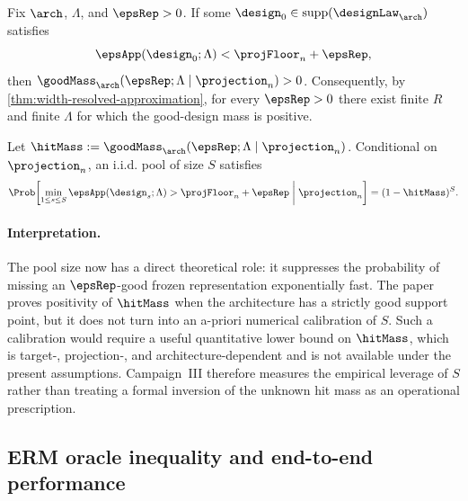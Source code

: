 \begin{proposition}
\label{prop:positive-good-mass}
Fix $\arch$, $\Lambda$, and $\epsRep>0$.  If some
$\design_0\in\operatorname{supp}(\designLaw_{\arch})$ satisfies
\begin{equation}
    \epsApp(\design_0;\Lambda)<\projFloor_n+\epsRep,
    \label{eq:strict-good-support-design}
\end{equation}
then
$\goodMass_{\arch}(\epsRep;\Lambda\mid\projection_n)>0$.
Consequently, by \cref{thm:width-resolved-approximation}, for every
$\epsRep>0$ there exist finite $R$ and finite $\Lambda$ for which the good-design
mass is positive.
\end{proposition}

\begin{proposition}
\label{prop:finite-pool-coverage}
Let $\hitMass:=\goodMass_{\arch}(\epsRep;\Lambda\mid\projection_n)$.
Conditional on $\projection_n$, an i.i.d. pool of size $S$ satisfies
\begin{equation}
    \Prob\!\left[
      \min_{1\leq s\leq S}\epsApp(\design_s;\Lambda)
      >\projFloor_n+\epsRep
      \;\middle|\;\projection_n
    \right]
    =(1-\hitMass)^S.
    \label{eq:pool-miss-probability}
\end{equation}
\end{proposition}

\paragraph{Interpretation.}
The pool size now has a direct theoretical role: it suppresses the probability
of missing an $\epsRep$-good frozen representation exponentially fast.  The
paper proves positivity of $\hitMass$ when the architecture has a
strictly good support point, but it does not turn
 into an a-priori numerical calibration of
$S$.  Such a calibration would require a useful quantitative lower bound on
$\hitMass$, which is target-, projection-, and architecture-dependent and is
not available under the present assumptions.  Campaign~III therefore measures
the empirical leverage of $S$ rather than treating a formal inversion of the
unknown hit mass as an operational prescription.

\subsection{ERM oracle inequality and end-to-end performance}
\label{sec:end-to-end-guarantee}

